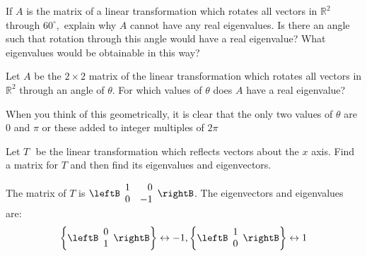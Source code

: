 \begin{enumialphparenastyle}

\begin{ex} If $A$ is the matrix of a linear transformation which rotates all
vectors in $\mathbb{R}^{2}$ through $60^{\circ },$ explain why $A$ cannot
have any real eigenvalues. Is there an angle such that rotation through this
angle would have a real eigenvalue? What eigenvalues would be obtainable in
this way? \vspace{1mm} 
\end{ex}


\begin{ex} Let $A$ be the $2\times 2$ matrix of the linear transformation which
rotates all vectors in $\mathbb{R}^{2}$ through an angle of $\theta $. For
which values of $\theta $ does $A$ have a real eigenvalue? 
\begin{sol}
When you think of this geometrically, it is clear that the only two values
of $\theta $ are 0 and $\pi $ or these added to integer multiples of $2\pi $
\end{sol}
\end{ex}


\begin{ex} Let $T\,$\ be the linear transformation which reflects vectors about
the $x$ axis. Find a matrix for $T$ and then find its eigenvalues and
eigenvectors. 
\begin{sol}
The matrix of $T$ is $\leftB
\begin{array}{rr}
1 & 0 \\
0 & -1
\end{array}
\rightB$. The eigenvectors and eigenvalues are:
\[
\left\{ \leftB
\begin{array}{c}
0 \\
1
\end{array}
\rightB \right\} \leftrightarrow -1,\left\{ \leftB
\begin{array}{c}
1 \\
0
\end{array}
\rightB \right\} \leftrightarrow 1
\]
\end{sol}
\end{ex}


\end{enumialphparenastyle}
